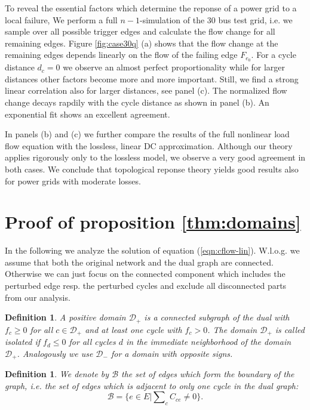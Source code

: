 \documentclass[10pt,aps,pra,twocolumn,superscriptaddress]{revtex4-1}
\newcommand{\be}{\begin{equation}}
\newcommand{\ee}{\end{equation}}
\newcommand{\DD}{\mathcal{D}}
\newtheorem{defn}[thm]{Definition}
\begin{document}
To reveal the essential factors which determine the reponse of a power grid to a local failure,
We perform a full $n-1$-simulation of the 30 bus test grid, i.e. we sample over all 
possible trigger edges and calculate the flow change for all remaining edges.
Figure \ref{fig:case30q} (a) shows that the flow change at the remaining edges depends linearly 
on the flow of the failing edge $F_{e_0}$. For a cycle distance $d_c=0$ we observe an almost
perfect proportionality while for larger distances other factors become more and more 
important. Still, we find a strong linear correlation also for larger distances, see panel (c).
The normalized flow change decays rapdily with the cycle distance as shown in panel (b). 
An exponential fit shows an excellent agreement.

In panels (b) and (c) we further compare the results of the full nonlinear load flow equation
with the lossless, linear DC approximation. Although our theory applies rigorously only to
the lossless model, we observe a very good agreement in both cases. We conclude that 
topological reponse theory yields good results also for power grids with moderate losses.

\section{Proof of proposition \ref{thm:domains}}
\label{sec:proof1}

In the following we analyze the solution of equation (\ref{eqn:cflow-lin}). W.l.o.g.  we 
assume that both the original network and the dual graph are connected. Otherwise we
can just focus on the connected component which includes the perturbed edge resp. the
perturbed cycles and exclude all disconnected parts from our analysis.

\begin{defn}
A positive domain $\DD_+$ is a connected subgraph of the dual with $f_c \ge 0$ 
for all $c \in \DD_+$ and at least one cycle with $f_c >0$. The domain $\DD_+$ is called 
isolated if $f_d \le 0$ for all cycles $d$ in the immediate neighborhood of the domain $\DD_+$. 
Analogously we use $\DD_-$ for a domain with opposite signs. 
\end{defn}

\begin{defn}
We denote by  $\mathcal{B}$ the set of edges which form the boundary of the graph, 
i.e. the set of edges which is adjacent to only one cycle in the dual graph:
\be
   \mathcal{B} = \Big\{ e \in E \Big| \sum \nolimits_{c} C_{ce} \neq 0 \Big\}.
\ee
\end{defn}
\end{document}
